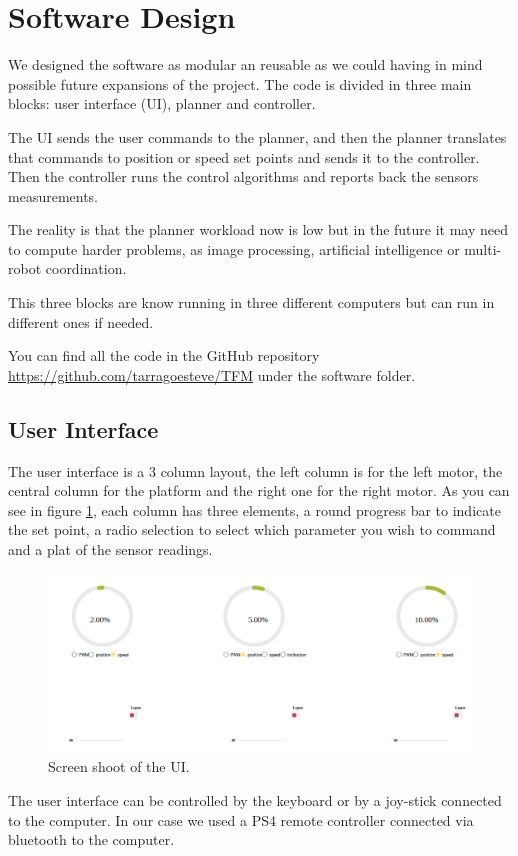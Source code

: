 \section{Software Design}
We designed the software as modular an reusable as we could having in mind
possible future expansions of the project.
The code is divided in three main blocks: user interface (UI), planner and controller.

The UI sends the user commands to the planner, and then the planner translates that commands to
position or speed set points and sends it to the controller. Then the controller runs the control algorithms
and reports back the sensors measurements.

The reality is that the planner workload now is low but in the future it may need to compute harder problems,
as image processing, artificial intelligence or multi-robot coordination.

This three blocks are know running in three different computers but can run in different ones if needed.

You can find all the code in the GitHub repository \url{https://github.com/tarragoesteve/TFM} under the 
software folder.

\subsection{User Interface}
The user interface is a 3 column layout, the left column is for the left motor, the central column for the platform
and the right one for the right motor. As you can see in figure \ref{fig: UI}, each column has three elements,
a round progress bar to indicate the set point, a radio selection to select which parameter you wish to command and a plat
of the sensor readings.
\begin{figure}[H]
    \centering
    \includegraphics[width=12cm]{img/components/ui.png}
    \caption{Screen shoot of the UI.}
    \label{fig: UI}
\end{figure}
The user interface can be controlled by the keyboard or by a joy-stick connected to the computer. In our case
we used a PS4 remote controller connected via bluetooth to the computer.

